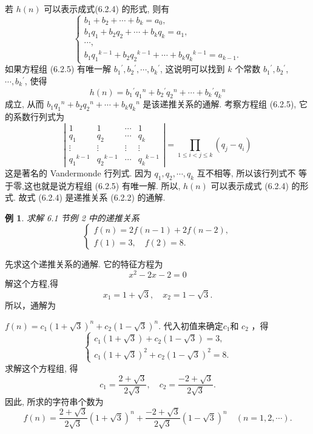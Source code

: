 \documentclass[punct]{ctexbeamer}
\newtheorem{ex}{例}[section]
\def\pf{\noindent {\bf 证明\ }}
\def\sol{\noindent {\bf 解\ }}
\begin{document}
\begin{frame}
	\pf
	 若 $h(n)$ 可以表示成式(6.2.4) 的形式, 则有
	\[
	\left\{\begin{array}{l}
		b_1+b_2+\cdots+b_k=a_0, \\
		b_1 q_1+b_2 q_2+\cdots+b_k q_k=a_1, \\
		\cdots, \\
		b_1 q_1{ }^{k-1}+b_2 q_2{ }^{k-1}+\cdots+b_k q_k{ }^{k-1}=a_{k-1} .
	\end{array}\right.\tag{6.2.5}
	\]
	如果方程组 (6.2.5) 有唯一解 $b_1{ }^{\prime}, b_2{ }^{\prime}, \cdots, b_k{ }^{\prime}$, 这说明可以找到 $k$ 个常数 $b_1{ }^{\prime}, b_2{ }^{\prime}$, $\cdots, b_k{ }^{\prime}$, 使得
	$$
	h(n)=b_1{ }^{\prime} q_1{ }^n+b_2{ }^{\prime} q_2{ }^n+\cdots+b_k{ }^{\prime} q_k{ }^n
	$$
	成立, 从而 $b_1 q_1{ }^n+b_2 q_2{ }^n+\cdots+b_k q_k{ }^n$ 是该递推关系的通解. 考察方程组 (6.2.5), 它的系数行列式为$$
	\left|\begin{array}{cccc}
		1 & 1 & \cdots & 1 \\
		q_1 & q_2 & \cdots & q_k \\
		\vdots & \vdots & \vdots & \vdots \\
		q_1{ }^{k-1} & q_2{ }^{k-1} & \cdots & q_k{ }^{k-1}
	\end{array}\right|=\prod_{1 \leqslant i<j \leqslant k}\left(q_j-q_i\right)
	$$
	这是著名的 Vandermonde 行列式. 因为 $q_1, q_2, \cdots, q_k$ 互不相等, 所以该行列式不 等于零,这也就是说方程组 (6.2.5) 有唯一解. 所以, $h(n)$ 可以表示成式 (6.2.4) 的形式.
	故式 (6.2.4) 是递推关系 (6.2.2) 的通解.
\end{frame}

\begin{frame}
	\begin{ex}
		求解 6.1 节例 2 中的递推关系
		$$
		\left\{\begin{array}{l}
			f(n)=2 f(n-1)+2 f(n-2), \\
			f(1)=3, \quad f(2)=8 .
		\end{array}\right.
		$$
	\end{ex}
\end{frame}

\begin{frame}
	\sol 先求这个递推关系的通解. 它的特征方程为$$
	x^2-2 x-2=0
	$$
	解这个方程,得
	$$
	x_1=1+\sqrt{3}, \quad x_2=1-\sqrt{3} .
	$$
	所以，通解为

	$f(n)=c_1\left(1+\sqrt{3}\right)^n+c_2 \left (1-\sqrt{3}\right)^n$.
	代入初值来确定$c_{1}$和
	$c_2$ ，得
	$$
	\left\{\begin{array}{l}
		c_1 \left(1+\sqrt{3}\right)+c_2\left(1-\sqrt{3}\right)=3, \\
		c_1\left(1+\sqrt{3}\right)^2+c_2\left(1-\sqrt{3}\right)^2=8 .
	\end{array}\right.
	$$
	求解这个方程组, 得
	$$
	c_1=\frac{2+\sqrt{3}}{2 \sqrt{3}}, \quad c_2=\frac{-2+\sqrt{3}}{2 \sqrt{3}} .
	$$
	因此, 所求的字符串个数为
	$$
	f(n)=\frac{2+\sqrt{3}}{2 \sqrt{3}}\left(1+\sqrt{3}\right)^n+\frac{-2+\sqrt{3}}{2 \sqrt{3}}\left(1-\sqrt{3}\right)^n \quad(n=1,2, \cdots) .
	$$
\end{frame}
\end{document}
